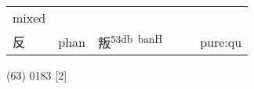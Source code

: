 \documentclass[14pt,a4paper]{scrartcl}
\begin{document}
\begin{longtable}[c]{@{}llllll@{}}
\begin{minipage}[t]{0.14\columnwidth}
mixed
\strut\end{minipage}\tabularnewline
\begin{minipage}[t]{0.14\columnwidth}\raggedright\strut
反
\strut\end{minipage} &
\begin{minipage}[t]{0.14\columnwidth}\raggedright\strut
phan
\strut\end{minipage} &
\begin{minipage}[t]{0.14\columnwidth}\raggedright\strut
叛\textsuperscript{53db~banH}
\strut\end{minipage} &
\begin{minipage}[t]{0.14\columnwidth}\raggedright\strut
\strut\end{minipage} &
\begin{minipage}[t]{0.14\columnwidth}\raggedright\strut
\strut\end{minipage} &
\begin{minipage}[t]{0.14\columnwidth}\raggedright\strut
pure:qu
\strut\end{minipage}\tabularnewline
\bottomrule
\end{longtable}

(63) 0183 {[}2{]}
\end{document}
